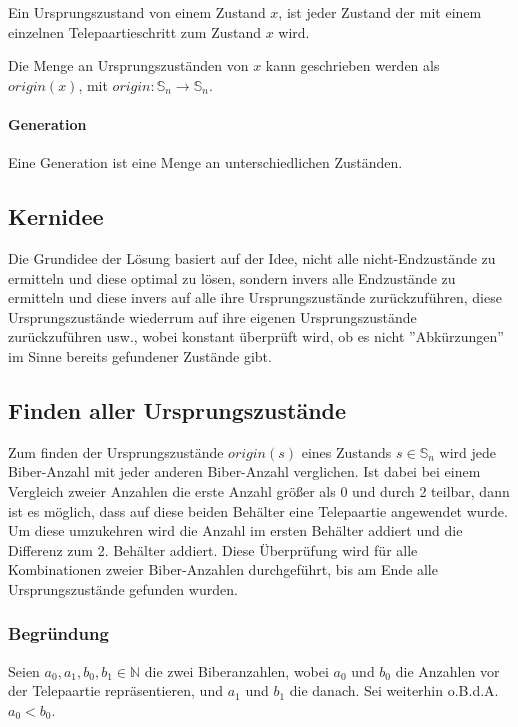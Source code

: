 \documentclass[a4paper,10pt,ngerman]{scrartcl}
\begin{document}
Ein Ursprungszustand von einem Zustand \(x\), ist jeder Zustand der mit einem einzelnen Telepaartieschritt zum Zustand \(x\) wird.

Die Menge an Ursprungszuständen von \(x\) kann geschrieben werden als \(origin(x)\), mit \(origin : \mathbb{S}_n \to \mathbb{S}_n \).

\paragraph{Generation} \label{def:generation}

Eine Generation ist eine Menge an unterschiedlichen Zuständen.

\subsection{Kernidee}

Die Grundidee der Lösung basiert auf der Idee, nicht alle nicht-Endzustände zu ermitteln und diese optimal zu lösen, sondern invers alle Endzustände zu ermitteln und diese invers auf alle ihre Ursprungszustände zurückzuführen, diese Ursprungszustände wiederrum auf ihre eigenen Ursprungszustände zurückzuführen usw., wobei konstant überprüft wird, ob es nicht ''Abkürzungen'' im Sinne bereits gefundener Zustände gibt.

\subsection{Finden aller Ursprungszustände} \label{alg:origin}

Zum finden der Ursprungszustände \(origin(s)\) eines Zustands \(s \in \mathbb{S}_n\) wird jede Biber-Anzahl mit jeder anderen Biber-Anzahl verglichen. Ist dabei bei einem Vergleich zweier Anzahlen die erste Anzahl größer als 0 und durch 2 teilbar, dann ist es möglich, dass auf diese beiden Behälter eine Telepaartie angewendet wurde. Um diese umzukehren wird die Anzahl im ersten Behälter addiert und die Differenz zum 2. Behälter addiert.
Diese Überprüfung wird für alle Kombinationen zweier Biber-Anzahlen durchgeführt, bis am Ende alle Ursprungszustände gefunden wurden.

\subsubsection{Begründung}

Seien \(a_0, a_1, b_0, b_1 \in \mathbb{N}\) die zwei Biberanzahlen, wobei \(a_0\) und \(b_0\) die Anzahlen vor der Telepaartie repräsentieren, und \(a_1\) und \(b_1\) die danach. Sei weiterhin o.B.d.A. \(a_0 < b_0\).
\end{document}
